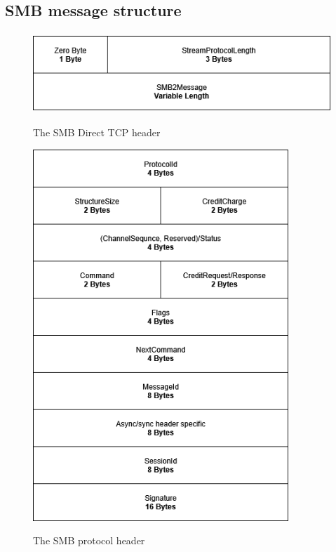 \documentclass[english, 12pt, a4paper, elec, utf8, a-2b, online]{aaltothesis}
\begin{document}
\subsection{SMB message structure}

\begin{figure}[h]
	\centering
	\includegraphics[alt={A block diagram of the SMB Direct TCP header format, detailing its fields and their sizes.}, height=3cm]{./images/smb_tcp_direct_header.drawio.png}
	\caption{The SMB Direct TCP header}
	\label{fig:direct_tcp_header}
\end{figure}

\begin{figure}[h]
	\centering
	\includegraphics[alt={A block diagram of the SMB2 Packet header common fields format, detailing its fields and their sizes.}, height=14cm]{./images/smb_packet_header_common.png}
	\caption{The SMB protocol header}
	\label{fig:smb2_transport_header}
\end{figure}
\end{document}
